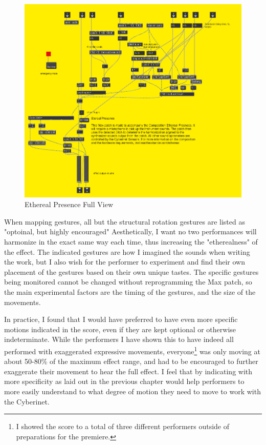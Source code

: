 \begin{figure}
    \centering
    \includegraphics[scale=0.75]{diagrams/maxPatches/ethereal_raw.png}
    \caption{Ethereal Presence Full View}
    \label{fig:etherealRaw}
\end{figure}

When mapping gestures, all but the structural rotation gestures are listed as "optoinal, but highly encouraged" Aesthetically, I want no two performances will harmonize in the exact same way each time, thus increasing the "etherealness" of the effect. The indicated gestures are how I imagined the sounds when writing the work, but I also wish for the performer to experiment and find their own placement of the gestures based on their own unique tastes. The specific gestures being monitored cannot be changed without reprogramming the Max patch, so the main experimental factors are the timing of the gestures, and the size of the movements.

In practice, I found that I would have preferred to have even more specific motions indicated in the score, even if they are kept optional or otherwise indeterminate. While the performers I have shown this to have indeed all performed with exaggerated expressive movements, everyone\footnote{I showed the score to a total of three different performers outside of preparations for the premiere.} was only moving at about 50-80\% of the maximum effect range, and had to be encouraged to further exaggerate their movement to hear the full effect. I feel that by indicating with more specificity as laid out in the previous chapter would help performers to more easily understand to what degree of motion they need to move to work with the Cyberinet. 

